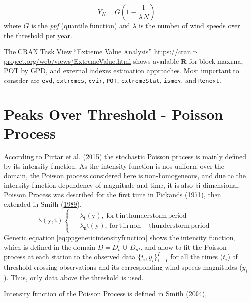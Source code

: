 \documentclass[12pt,oneside]{reedthesis}
\begin{document}
\[
Y_N = G\left(1-\frac{1}{\lambda\,N}\right)
\]
where \(G\) is the \emph{ppf} (quantile function) and \(\lambda\) is the number of wind speeds over the threshold per year.

The CRAN Task View ``Extreme Value Analysis'' \url{https://cran.r-project.org/web/views/ExtremeValue.html} shows available \textbf{R} for block maxima, POT by GPD, and external indexes estimation approaches. Most important to consider are \texttt{evd}, \texttt{extremes}, \texttt{evir}, \texttt{POT}, \texttt{extremeStat}, \texttt{ismev}, and \texttt{Renext}.

\hypertarget{pot-pp}{%
\section{Peaks Over Threshold - Poisson Process}\label{pot-pp}}

According to Pintar et al. (\protect\hyperlink{ref-Pintar2015}{2015}) the stochastic Poisson process is mainly defined by its intensity function. As the intensity function is nos uniform over the domain, the Poisson process considered here is non-homogeneous, and due to the intensity function dependency of magnitude and time, it is also bi-dimensional. Poisson Process was described for the first time in Pickands (\protect\hyperlink{ref-Pickands1971}{1971}), then extended in Smith (\protect\hyperlink{ref-Smith1989}{1989}).
\begin{equation}
  \mathrm{
    \lambda\left(y,t\right)
    \begin{cases}
      \begin{split}
            &\lambda_t(y),\;for\,t\,in\,thunderstorm\,period
            \\
            &\lambda_nt(y),\;for\,t\,in\,non-thunderstorm\,period      
      \end{split}
    \end{cases}
  }
  \label{eq:ppgenericintensityfunction}
\end{equation}
Generic equation \eqref{eq:ppgenericintensityfunction} shows the intensity function, which is defined in the domain \(D = D_t\,{\cup}\,D_{nt}\), and allow to fit the Poisson process at each station to the observed data \(\{t_i, y_i\}_{i=1}^I\) for all the times (\(t_i\)) of threshold crossing observations and its corresponding wind speeds magnitudes (\(y_i\)). Thus, only data above the threshold is used.

Intensity function of the Poisson Process is defined in Smith (\protect\hyperlink{ref-Smith2004}{2004}),
\end{document}
